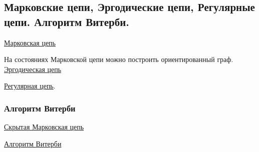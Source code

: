 \subsection{Марковские цепи, Эргодические цепи, Регулярные цепи. Алгоритм Витерби.}

\href{https://neerc.ifmo.ru/wiki/index.php?title=%D0%9C%D0%B0%D1%80%D0%BA%D0%BE%D0%B2%D1%81%D0%BA%D0%B0%D1%8F_%D1%86%D0%B5%D0%BF%D1%8C}{Марковская цепь}

На состояниях Марковской цепи можно построить ориентированный граф.
\href{https://neerc.ifmo.ru/wiki/index.php?title=%D0%AD%D1%80%D0%B3%D0%BE%D0%B4%D0%B8%D1%87%D0%B5%D1%81%D0%BA%D0%B0%D1%8F_%D0%BC%D0%B0%D1%80%D0%BA%D0%BE%D0%B2%D1%81%D0%BA%D0%B0%D1%8F_%D1%86%D0%B5%D0%BF%D1%8C}{Эргодическая цепь}

\href{https://neerc.ifmo.ru/wiki/index.php?title=%D0%A0%D0%B5%D0%B3%D1%83%D0%BB%D1%8F%D1%80%D0%BD%D0%B0%D1%8F_%D0%BC%D0%B0%D1%80%D0%BA%D0%BE%D0%B2%D1%81%D0%BA%D0%B0%D1%8F_%D1%86%D0%B5%D0%BF%D1%8C}{Регулярная цепь}.

\subsubsection{Алгоритм Витерби}
\href{https://neerc.ifmo.ru/wiki/index.php?title=%D0%A1%D0%BA%D1%80%D1%8B%D1%82%D1%8B%D0%B5_%D0%9C%D0%B0%D1%80%D0%BA%D0%BE%D0%B2%D1%81%D0%BA%D0%B8%D0%B5_%D0%BC%D0%BE%D0%B4%D0%B5%D0%BB%D0%B8}{Скрытая Марковская цепь}

\href{https://neerc.ifmo.ru/wiki/index.php?title=%D0%90%D0%BB%D0%B3%D0%BE%D1%80%D0%B8%D1%82%D0%BC_%D0%92%D0%B8%D1%82%D0%B5%D1%80%D0%B1%D0%B8}{Алгоритм Витерби}